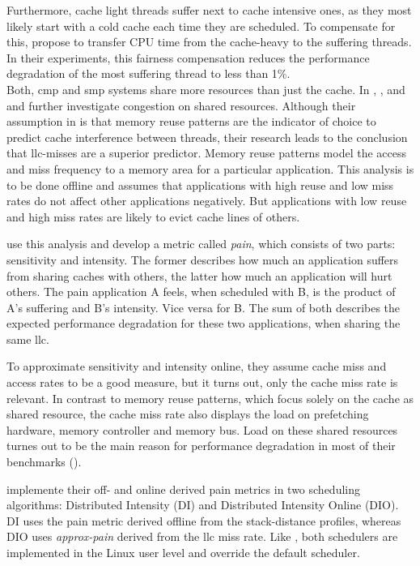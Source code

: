 Furthermore, cache light threads suffer next to cache intensive ones, as they
most likely start with a cold cache each time they are scheduled.
To compensate for this, \citeauthor{knauerhase_using_2008} propose to transfer
CPU time from the cache-heavy to the suffering threads.
In their experiments, this fairness compensation reduces the performance
degradation of the most suffering thread to less than 1\%.
\\

Both, \gls{cmp} and \gls{smp} systems share more resources than just the cache.
In \cite{fedorova_managing_2010}, \cite{zhuravlev_addressing_2010}, and
\cite{zhuravlev_survey_2012} \citeauthor{fedorova_managing_2010} and
\citeauthor{zhuravlev_addressing_2010} further investigate congestion on shared
resources.
Although their assumption in \cite{fedorova_managing_2010} is that memory
reuse patterns are the indicator of
choice to predict cache interference between threads, their research leads to
the conclusion that \gls{llc}-misses are a superior predictor.
Memory reuse patterns model the access and miss frequency to a memory area for
a particular application.
This analysis is to be done offline and assumes that applications with high
reuse and low miss rates do not affect other applications negatively.
But applications with low reuse and high miss rates are likely to evict cache
lines of others.

\citeauthor{zhuravlev_addressing_2010} use this analysis and develop a
metric called \emph{pain}, which consists of two parts: sensitivity and intensity.
The former describes how much an application suffers from sharing caches with
others, the latter how much an application will hurt others.
The pain application A feels, when scheduled with B, is the product of A's
suffering and B's intensity.
Vice versa for B.
The sum of both describes the expected performance degradation for these two
applications, when sharing the same \gls{llc}.

To approximate sensitivity and intensity online, they assume cache miss and
access rates to be a good measure, but it turns out, only the cache miss
rate is relevant.
In contrast to memory reuse patterns, which focus solely on the cache as shared
resource, the cache miss rate also displays the load on prefetching hardware,
memory controller and memory bus.
Load on these shared resources turnes out to be the main reason for performance
degradation in most of their benchmarks (\cite{zhuravlev_addressing_2010}).

\citeauthor{zhuravlev_addressing_2010} implemente their off- and online
derived pain metrics in two scheduling algorithms: Distributed Intensity (DI)
and Distributed Intensity Online (DIO).
DI uses the pain metric derived offline from the stack-distance profiles,
whereas DIO uses \emph{approx-pain} derived from the \gls{llc} miss rate.
Like \cite{banikazemi_pam_2008}, both schedulers are implemented in the
Linux user level and override the default scheduler.

